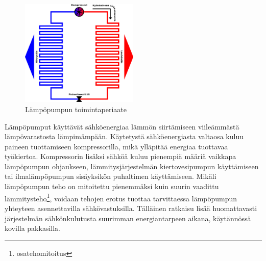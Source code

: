   \begin{figure}
    \centering
    \includegraphics[width=0.5\textwidth]{figures/hp}
    \caption{Lämpöpumpun toimintaperiaate}
    \label{fig:hptp}
  \end{figure}

  Lämpöpumput käyttävät sähköenergiaa lämmön siirtämiseen viileämmästä lämpövarastosta lämpimämpään. Käytetystä sähköenergiasta valtaosa kuluu paineen tuottamiseen kompressorilla, mikä ylläpitää energiaa tuottavaa työkiertoa. Kompressorin lisäksi sähköä kuluu pienempiä määriä vaikkapa lämpöpumpun ohjaukseen, lämmitysjärjestelmän kiertovesipumpun käyttämiseen tai ilmalämpöpumpun sisäyksikön puhaltimen käyttämiseen. Mikäli lämpöpumpun teho on mitoitettu pienemmäksi kuin suurin vaadittu lämmitysteho\footnote{osatehomitoitus}, voidaan tehojen erotus tuottaa tarvittaessa lämpöpumpun yhteyteen asennettavilla sähkövastuksilla. Tälläinen ratkaisu lisää huomattavasti järjestelmän sähkönkulutusta suurimman energiantarpeen aikana, käytännössä kovilla pakkasilla.



  
